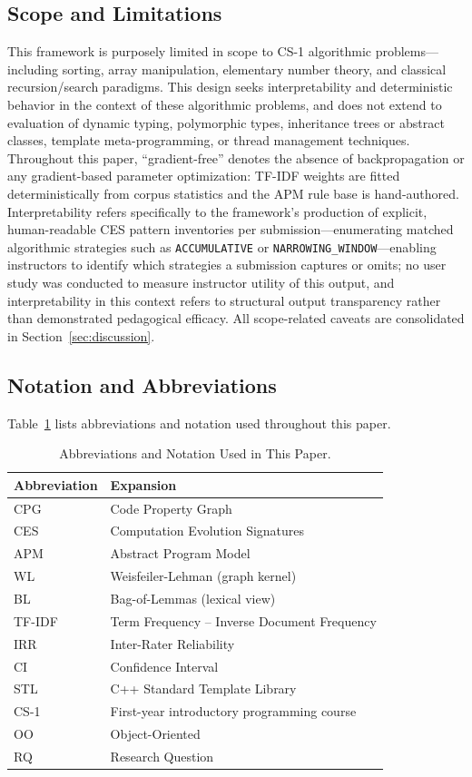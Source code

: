 \subsection{Scope and Limitations}
\label{subsec:scope}
This framework is purposely limited in scope to CS-1 algorithmic problems---including sorting, array manipulation, elementary number theory, and classical recursion/search paradigms. This design seeks interpretability and deterministic behavior in the context of these algorithmic problems, and does not extend to evaluation of dynamic typing, polymorphic types, inheritance trees or abstract classes, template meta-programming, or thread management techniques. Throughout this paper, ``gradient-free'' denotes the absence of backpropagation or any gradient-based parameter optimization: TF-IDF weights are fitted deterministically from corpus statistics and the APM rule base is hand-authored. Interpretability refers specifically to the framework's production of explicit, human-readable CES pattern inventories per submission---enumerating matched algorithmic strategies such as \texttt{ACCUMULATIVE} or \texttt{NARROWING\_WINDOW}---enabling instructors to identify which strategies a submission captures or omits; no user study was conducted to measure instructor utility of this output, and interpretability in this context refers to structural output transparency rather than demonstrated pedagogical efficacy. All scope-related caveats are consolidated in Section~\ref{sec:discussion}.

\subsection{Notation and Abbreviations}
\label{subsec:abbreviations}

Table~\ref{tab:abbreviations} lists abbreviations and notation used throughout this paper.

\begin{table}[ht]
\caption{Abbreviations and Notation Used in This Paper.}
\label{tab:abbreviations}
\centering
\begin{tabular}{|l|l|}
\hline
\textbf{Abbreviation} & \textbf{Expansion} \\
\hline
CPG   & Code Property Graph \\
CES   & Computation Evolution Signatures \\
APM   & Abstract Program Model \\
WL    & Weisfeiler-Lehman (graph kernel) \\
BL    & Bag-of-Lemmas (lexical view) \\
TF-IDF & Term Frequency -- Inverse Document Frequency \\
IRR   & Inter-Rater Reliability \\
CI    & Confidence Interval \\
STL   & C++ Standard Template Library \\
CS-1  & First-year introductory programming course \\
OO    & Object-Oriented \\
RQ    & Research Question \\
\hline
\end{tabular}
\end{table}

